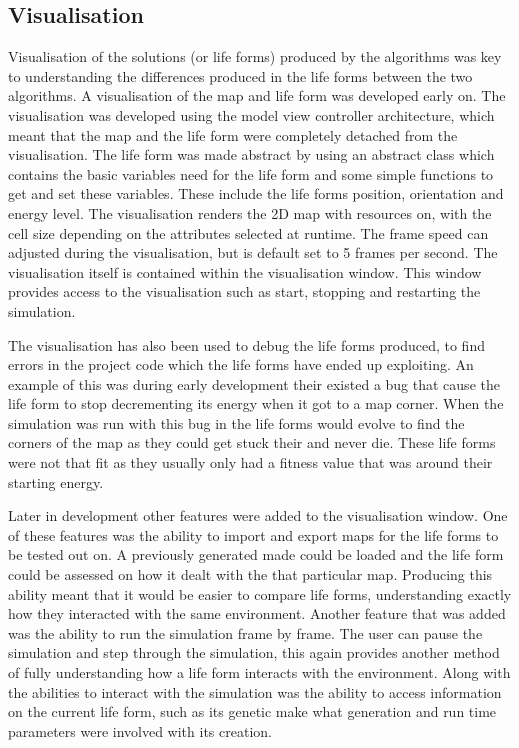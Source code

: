 \documentclass[12pt]{article}
\begin{document}
\subsection{Visualisation}
Visualisation of the solutions (or life forms) produced by the algorithms was key
to understanding the differences produced in the life forms between the two algorithms. A visualisation of the map and life form
was developed early on. The visualisation was developed using the model view controller architecture,
which meant that the map and the life form were completely detached from the visualisation.
The life form was made abstract by using an abstract class which contains the basic variables need for the life
form and some simple functions to get and set these variables. These include the life forms position, orientation
and energy level. The visualisation renders the 2D map with resources on, with the cell size depending on the attributes selected at runtime. The frame speed can
adjusted during the visualisation, but is default set to 5 frames per second. The visualisation itself is contained within the visualisation window. This window
provides access to the visualisation such as start, stopping and restarting the simulation.


The visualisation has also been used to debug the life forms produced, to find errors in the project code which the life forms have ended up exploiting. An example
of this was during early development their existed a bug that cause the life form to stop decrementing its energy when it got to a map corner. When the simulation
was run with this bug in the life forms would evolve to find the corners of the map as they could get stuck their and never die. These life forms were not that fit 
as they usually only had a fitness value that was around their starting energy.

Later in development other features were added to the visualisation window. One of these features was the ability to import and export maps for the life forms to be
tested out on. A previously generated made could be loaded and the life form could be assessed on how it dealt with the that particular map. Producing this ability meant that it would be easier to compare life forms, understanding exactly how they interacted with the same environment.
Another feature that was added was the ability to run the simulation frame by frame. The user can pause the simulation and step through the simulation, this again provides another method of fully understanding how a life form interacts with the environment. 
Along with the abilities to interact with the simulation was the ability to access information on the current life form, such as its genetic make what generation
and run time parameters were involved with its creation.
\end{document}
